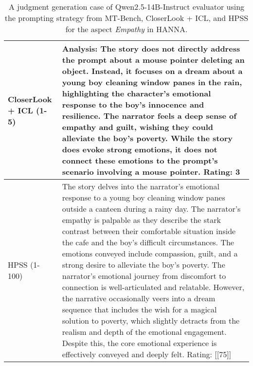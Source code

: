 \begin{table*}[!ht]
\begin{tabular}{p{55pt}p{365pt}}
    \midrule
    CloserLook + ICL (1-5) & Analysis: The story does not directly address the prompt about a mouse pointer deleting an object. Instead, it focuses on a dream about a young boy cleaning window panes in the rain, highlighting the character's emotional response to the boy's innocence and resilience. The narrator feels a deep sense of empathy and guilt, wishing they could alleviate the boy's poverty. While the story does evoke strong emotions, it does not connect these emotions to the prompt's scenario involving a mouse pointer.\newline\newline
    Rating: 3  \\
    \midrule 
    HPSS (1-100)  & The story delves into the narrator's emotional response to a young boy cleaning window panes outside a canteen during a rainy day. The narrator's empathy is palpable as they describe the stark contrast between their comfortable situation inside the cafe and the boy's difficult circumstances. The emotions conveyed include compassion, guilt, and a strong desire to alleviate the boy's poverty. The narrator's emotional journey from discomfort to connection is well-articulated and relatable. However, the narrative occasionally veers into a dream sequence that includes the wish for a magical solution to poverty, which slightly detracts from the realism and depth of the emotional engagement. Despite this, the core emotional experience is effectively conveyed and deeply felt.\newline\newline
    Rating: [[75]] \\
    \bottomrule
    \end{tabular}
    \vspace{-2mm}
    \caption{A judgment generation case of Qwen2.5-14B-Instruct evaluator using the prompting strategy from MT-Bench, CloserLook + ICL, and HPSS for the aspect \textit{Empathy} in HANNA.}
    \label{tab:judgement_case_2}
\end{table*}